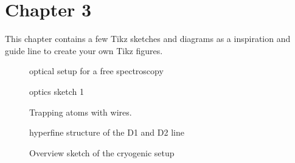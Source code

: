 \chapter{Chapter 3}\label{chap:chapter_3}
This chapter contains a few Tikz sketches and diagrams as a inspiration and guide line to create your own Tikz figures.

\begin{figure}[H]
	\centering
	\resizebox{\textwidth}{!}{
		\begin{tikzpicture}[use optics, scale=1.0]
			
		\end{tikzpicture}
	}
	\caption[DFS setup]{optical setup for a  free spectroscopy}
	\label{fig:dfs}
\end{figure}

\begin{figure}[H]
	\centering
	\begin{tikzpicture}[use optics, scale=0.7]
		
	\end{tikzpicture}
	\caption[optics sketch 1]{optics sketch 1}
	\label{fig:reflective_imaging_setup}
\end{figure}

\begin{figure}[H]
	\centering
	\begin{tikzpicture}[use optics, scale=0.7]
		
	\end{tikzpicture}
	\caption[trapping atoms wiht a wire]{Trapping atoms with wires.}
	\label{fig:trapping_atoms_with_a_wire}
\end{figure}

\clearpage
\begin{figure}[H]
	\centering	
	\begin{tikzpicture}[scale=0.55]
		
	\end{tikzpicture}
	\caption[\Rb D1,D2 line]{\Rb hyperfine structure of the D1 and D2 line}
	\label{fig:Rb_hyperfine_structure}
\end{figure}

\begin{figure}[H]
	\centering
	\begin{tikzpicture}[scale=0.48]
		
	\end{tikzpicture}
	\caption[overview of cryogenic setup]{Overview sketch of the cryogenic setup}
	\label{fig:cryogenic_overview}
\end{figure}

